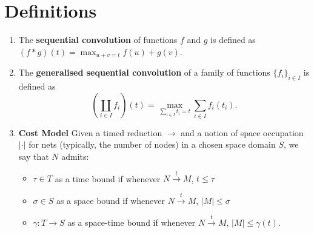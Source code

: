 \documentclass{fit-teorsem}
\begin{document}
\section*{Definitions}
\begin{enumerate}
\item The \textbf{sequential convolution} of functions $f$ and $g$ is defined as
	$(f \ast g)(t) = \max_{u + v = t} f(u) + g(v)$.

\item The \textbf{generalised sequential convolution} of a family of functions $\{f_i\}_{i \in I}$ is
	defined as \[
		\left(\coprod_{i \in I} f_i\right)(t) = \max_{\sum_{i \in I} t_i = t} \sum_{i \in I} f_i(t_i)
	.\]

\item \textbf{Cost Model} Given a timed reduction $\longrightarrow$ and a notion of space
	occupation $|\cdot|$ for nets (typically, the number of nodes) in a chosen
	space domain $S$, we say that $N$ admits:
	\begin{itemize}
		\item $\tau \in T$ as a time bound if whenever
			$N \stackrel{t}{\longrightarrow} M$, $t \le \tau$
		\item $\sigma \in S$ as a space bound if whenever
			$N \stackrel{t}{\longrightarrow} M$, $|M| \le \sigma$
		\item $\gamma : T \to S$ as a space-time bound if whenever
			$N \stackrel{t}{\longrightarrow} M$, $|M| \le \gamma(t).$
	\end{itemize}
\end{enumerate}
\end{document}
